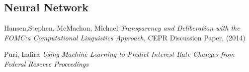 \documentclass[11pt]{article}
\begin{document}
\subsection{Neural Network} 



\begin{thebibliography}{99}

 Hansen,Stephen, McMachon, Michael  \emph{Transparency and Deliberation with the FOMC:a Computational Linquistics Approach}, CEPR Discussion Paper, (2014)

 Puri, Indira \emph{Using Machine Learning to Predict Interest Rate Changes from Federal Reserve Proceedings}
\end{thebibliography}
\end{document}
